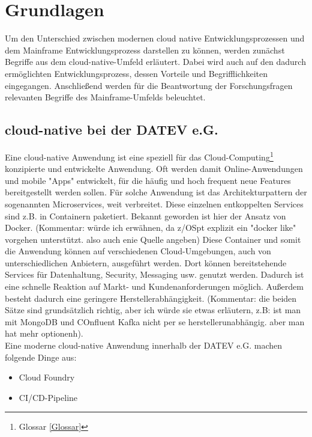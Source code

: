 \chapter{Grundlagen}\label{ch:grundlagen}
Um den Unterschied zwischen modernen cloud native Entwicklungsprozessen und dem Mainframe Entwicklungsprozess darstellen zu können, werden zunächst Begriffe aus dem cloud-native-Umfeld erläutert.
Dabei wird auch auf den dadurch ermöglichten Entwicklungsprozess, dessen Vorteile und Begrifflichkeiten eingegangen.
Anschließend werden für die Beantwortung der Forschungsfragen relevanten Begriffe des Mainframe-Umfelds beleuchtet.

\section{cloud-native bei der DATEV e.G.}
Eine cloud-native Anwendung ist eine speziell für das Cloud-Computing\footnote{Glossar \ref{Glossar}} konzipierte und entwickelte Anwendung.
Oft werden damit Online-Anwendungen und mobile "Apps" entwickelt, für die häufig und hoch frequent neue Features bereitgestellt werden sollen. 
Für solche Anwendung ist das Architekturpattern der sogenannten \glqq Microservices\grqq, weit verbreitet.
Diese einzelnen entkoppelten Services sind z.B. in Containern paketiert. 
Bekannt geworden ist hier der Ansatz von Docker. (Kommentar: würde ich erwähnen, da z/OSpt explizit ein "docker like" vorgehen unterstützt. also auch enie Quelle angeben)
Diese Container und somit die Anwendung können auf verschiedenen Cloud-Umgebungen, auch von unterschiedlichen Anbietern,  ausgeführt werden.
Dort können bereitstehende Services für Datenhaltung, Security, Messaging usw. genutzt werden. 
Dadurch ist eine schnelle Reaktion auf Markt- und Kundenanforderungen möglich.
Außerdem besteht dadurch eine geringere Herstellerabhängigkeit. (Kommentar: die beiden Sätze sind grundsätzlich richtig, aber ich würde sie etwas erläutern, z.B: ist man mit MongoDB und COnfluent Kafka nicht per se herstellerunabhängig. aber man hat mehr optionenh).\cite{cloudnative.23.2.2020}\\
Eine moderne cloud-native Anwendung innerhalb der DATEV e.G. machen folgende Dinge aus:
\begin{itemize}
\item \glqq Cloud Foundry\grqq
\item CI/CD-Pipeline
\end{itemize}

